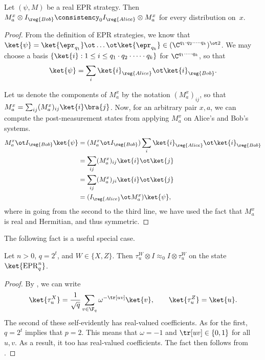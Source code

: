 \begin{fact}\label{fact:heh-heh-heh-gonna-make-anand-prove-this-so-i-can-take-the-day-off}
Let $(\psi, M)$ be a real EPR strategy.
Then $M^x_a \otimes I_{\reg{Bob}} \consistency_0 I_{\reg{Alice}} \otimes M^x_a$ for every distribution on~$x$.
\end{fact}
\begin{proof}
  From the definition of EPR strategies, we know that $\ket{\psi} =
  \ket{\epr_{q_1}} \ot \dots \ot \ket{\epr_{q_k}} \in (\C^{q_1 \cdot
    q_2 \cdot \dots \cdot q_k})^{\ot 2}$. We may choose a basis
  $\{\ket{i} : 1 \leq i \leq q_1 \cdot q_2 \cdot \dots \cdot q_k\}$
  for $\C^{q_1 \cdot \dots \cdot q_k}$, so that
  \[ \ket{\psi} = \sum_{i} \ket{i}_{\reg{Alice}} \ot
    \ket{i}_{\reg{Bob}} . \]
  
Let us denote the components of $M^x_a$ by the notation
$(M^x_a)_{ij}$, so that $M^x_a = \sum_{ij} (M^x_a)_{ij}
\ket{i}\bra{j}$.  Now, for an arbitrary pair $x, a$, we can compute
the post-measurement states from applying $M^x_a$ on Alice's and Bob's systems.
\begin{align*}
  M^x_a \ot I_{\reg{Bob}} \ket{\psi} &= (M^x_a \ot I_{\reg{Bob}}) \sum_{i} \ket{i}_{\reg{Alice}}
                                       \ot \ket{i}_{\reg{Bob}} \\
                                     &= \sum_{ij} (M^x_a)_{ij} \ket{i}
                                       \ot \ket{j} \\
                                     &= \sum_{ij} (M^x_a)_{ji} \ket{i}
                                       \ot \ket{j} \\
                                     &= (I_{\reg{Alice}} \ot M^x_a) \ket{\psi},
\end{align*}
where in going from the second to the third line, we have used the
fact that $M^x_a$ is real and Hermitian, and thus symmetric.
\end{proof}

The following fact is a useful special case.

\begin{fact}\label{fact:the-ol-pauli-swaperoonie}
Let $n > 0$, $q = 2^t$, and $W \in \{X, Z\}$.
Then $\tau^W_u \otimes I \approx_0 I \otimes \tau^W_u$ on the state $\ket{\mathrm{EPR}_q^n}$.
\end{fact}
\begin{proof}
By , we can write 
\begin{equation*}
  \ket{\tau^X_u} = \frac{1}{\sqrt{q}} \sum_{v \in \F_q}
  \omega^{-\tr[uv]} \ket{v},\qquad \ket{\tau^Z_u} = \ket{u}.
\end{equation*}
The second of these self-evidently has real-valued coefficients.
As for the first, $q = 2^t$ implies that $p = 2$.
This means that $\omega = -1$ and $\tr[uv] \in \{0, 1\}$ for all $u, v$.
As a result, it too has real-valued coefficients.
The fact then follows from .
\end{proof}

